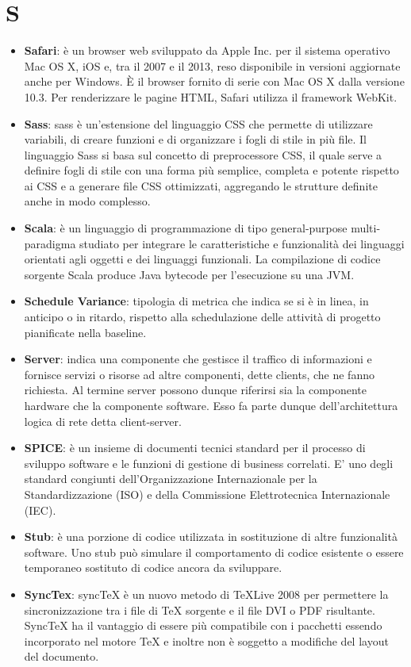 \section{S}
\begin{itemize} 
	\item
	\textbf{Safari}: è un browser web sviluppato da Apple Inc. per il sistema operativo Mac OS X, iOS e, tra il 2007 e il 2013, reso disponibile in versioni aggiornate anche per Windows. È il browser fornito di serie con Mac OS X dalla versione 10.3. Per renderizzare le pagine HTML, Safari utilizza il framework WebKit.
	\item
	\textbf{Sass}: sass è un'estensione del linguaggio CSS che permette di utilizzare variabili, di creare funzioni e di organizzare i fogli di stile in più file. Il linguaggio Sass si basa sul concetto di preprocessore CSS, il quale serve a definire fogli di stile con una forma più semplice, completa e potente rispetto ai CSS e a generare file CSS ottimizzati, aggregando le strutture definite anche in modo complesso.
	\item
	\textbf{Scala}: è un linguaggio di programmazione di tipo general-purpose multi-paradigma studiato per integrare le caratteristiche e funzionalità dei linguaggi orientati agli oggetti e dei linguaggi funzionali. La compilazione di codice sorgente Scala produce Java bytecode per l'esecuzione su una JVM.
	\item
	\textbf{Schedule Variance}: tipologia di metrica che indica se si è in linea, in anticipo o in ritardo, rispetto alla schedulazione delle attività di progetto pianificate nella baseline.
	\item
	\textbf{Server}: indica una componente che gestisce il traffico di informazioni e fornisce servizi o risorse ad altre componenti, dette clients, che ne fanno richiesta. Al termine server possono dunque riferirsi sia la componente hardware che la componente software. Esso fa parte dunque dell'architettura logica di rete detta client-server.
	\item 
	\textbf{SPICE}: è un insieme di documenti tecnici standard per il processo di sviluppo software e le funzioni di gestione di business correlati. E' uno degli standard congiunti dell'Organizzazione Internazionale per la Standardizzazione (ISO) e della Commissione Elettrotecnica Internazionale (IEC).
	\item
	\textbf{Stub}:  è una porzione di codice utilizzata in sostituzione di altre funzionalità software. Uno stub può simulare il comportamento di codice esistente o essere temporaneo sostituto di codice ancora da sviluppare. 
	\item
	\textbf{SyncTex}: syncTeX è un nuovo metodo di TeXLive 2008 per permettere la sincronizzazione tra i file di TeX sorgente e il file DVI o PDF risultante. SyncTeX ha il vantaggio di essere più compatibile con i pacchetti essendo incorporato nel motore TeX e inoltre non è soggetto a modifiche del layout del documento.
\end{itemize}